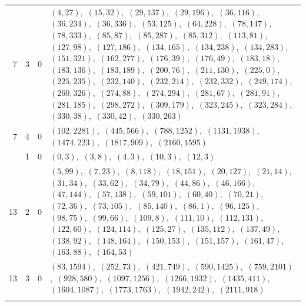 \documentclass[11pt]{article}
\begin{document}
\begin{longtable}{@{}rrl>{\raggedright\arraybackslash}p{}@{}}
7 & 3 & $0$ & $(4,27)$,\allowbreak\ $(15,32)$,\allowbreak\ $(29,137)$,\allowbreak\ $(29,196)$,\allowbreak\ $(36,116)$,\allowbreak\ $(36,234)$,\allowbreak\ $(36,336)$,\allowbreak\ $(53,125)$,\allowbreak\ $(64,228)$,\allowbreak\ $(78,147)$,\allowbreak\ $(78,333)$,\allowbreak\ $(85,87)$,\allowbreak\ $(85,287)$,\allowbreak\ $(85,312)$,\allowbreak\ $(113,81)$,\allowbreak\ $(127,98)$,\allowbreak\ $(127,186)$,\allowbreak\ $(134,165)$,\allowbreak\ $(134,238)$,\allowbreak\ $(134,283)$,\allowbreak\ $(151,321)$,\allowbreak\ $(162,277)$,\allowbreak\ $(176,39)$,\allowbreak\ $(176,49)$,\allowbreak\ $(183,18)$,\allowbreak\ $(183,136)$,\allowbreak\ $(183,189)$,\allowbreak\ $(200,76)$,\allowbreak\ $(211,130)$,\allowbreak\ $(225,0)$,\allowbreak\ $(225,235)$,\allowbreak\ $(232,140)$,\allowbreak\ $(232,214)$,\allowbreak\ $(232,332)$,\allowbreak\ $(249,174)$,\allowbreak\ $(260,326)$,\allowbreak\ $(274,88)$,\allowbreak\ $(274,294)$,\allowbreak\ $(281,67)$,\allowbreak\ $(281,91)$,\allowbreak\ $(281,185)$,\allowbreak\ $(298,272)$,\allowbreak\ $(309,179)$,\allowbreak\ $(323,245)$,\allowbreak\ $(323,284)$,\allowbreak\ $(330,38)$,\allowbreak\ $(330,42)$,\allowbreak\ $(330,263)$\\
7 & 4 & $0$ & $(102,2281)$,\allowbreak\ $(445,566)$,\allowbreak\ $(788,1252)$,\allowbreak\ $(1131,1938)$,\allowbreak\ $(1474,223)$,\allowbreak\ $(1817,909)$,\allowbreak\ $(2160,1595)$\\
\addlinespace[3pt]
13 & 1 & $0$ & $(0,3)$,\allowbreak\ $(3,8)$,\allowbreak\ $(4,3)$,\allowbreak\ $(10,3)$,\allowbreak\ $(12,3)$\\
13 & 2 & $0$ & $(5,99)$,\allowbreak\ $(7,23)$,\allowbreak\ $(8,118)$,\allowbreak\ $(18,151)$,\allowbreak\ $(20,127)$,\allowbreak\ $(21,14)$,\allowbreak\ $(31,34)$,\allowbreak\ $(33,62)$,\allowbreak\ $(34,79)$,\allowbreak\ $(44,86)$,\allowbreak\ $(46,166)$,\allowbreak\ $(47,144)$,\allowbreak\ $(57,138)$,\allowbreak\ $(59,101)$,\allowbreak\ $(60,40)$,\allowbreak\ $(70,21)$,\allowbreak\ $(72,36)$,\allowbreak\ $(73,105)$,\allowbreak\ $(85,140)$,\allowbreak\ $(86,1)$,\allowbreak\ $(96,125)$,\allowbreak\ $(98,75)$,\allowbreak\ $(99,66)$,\allowbreak\ $(109,8)$,\allowbreak\ $(111,10)$,\allowbreak\ $(112,131)$,\allowbreak\ $(122,60)$,\allowbreak\ $(124,114)$,\allowbreak\ $(125,27)$,\allowbreak\ $(135,112)$,\allowbreak\ $(137,49)$,\allowbreak\ $(138,92)$,\allowbreak\ $(148,164)$,\allowbreak\ $(150,153)$,\allowbreak\ $(151,157)$,\allowbreak\ $(161,47)$,\allowbreak\ $(163,88)$,\allowbreak\ $(164,53)$\\
13 & 3 & $0$ & $(83,1594)$,\allowbreak\ $(252,73)$,\allowbreak\ $(421,749)$,\allowbreak\ $(590,1425)$,\allowbreak\ $(759,2101)$,\allowbreak\ $(928,580)$,\allowbreak\ $(1097,1256)$,\allowbreak\ $(1266,1932)$,\allowbreak\ $(1435,411)$,\allowbreak\ $(1604,1087)$,\allowbreak\ $(1773,1763)$,\allowbreak\ $(1942,242)$,\allowbreak\ $(2111,918)$\\
\addlinespace[3pt]
\end{longtable}
\endgroup
\end{document}
